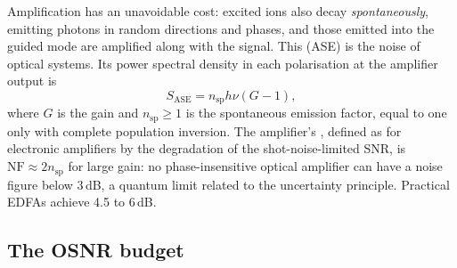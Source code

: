 Amplification has an unavoidable cost: excited ions also decay \emph{spontaneously}, emitting photons in
random directions and phases, and those emitted into the guided mode are amplified along with the signal.
This  (ASE) is the noise of optical systems. Its power spectral
density in each polarisation at the amplifier output is
\begin{equation}
S_{\mathrm{ASE}}=n_{\mathrm{sp}}h\nu(G-1),
\end{equation}
where $G$ is the gain and $n_{\mathrm{sp}}\ge1$ is the spontaneous emission factor, equal to one only with
complete population inversion. The amplifier's , defined as for electronic amplifiers
by the degradation of the shot-noise-limited SNR, is $\mathrm{NF}\approx2n_{\mathrm{sp}}$ for large gain:
no phase-insensitive optical amplifier can have a noise figure below 3\,dB, a quantum limit related to the
uncertainty principle. Practical EDFAs achieve 4.5 to 6\,dB.

\subsection{The OSNR budget}

